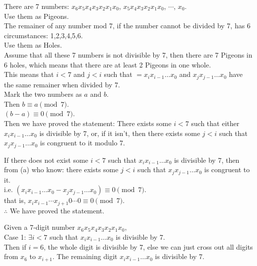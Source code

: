\documentclass[12pt]{exam}
\begin{document}
\begin{solution} 
    \begin{qparts}
        \item
        There are 7 numbers: $x_6 x_5 x_4 x_3 x_2 x_1 x_0$, $x_5 x_4 x_3 x_2 x_1 x_0$, $\cdots$, $x_0$.\\
        Use them as Pigeons.\\
        The remainer of any number mod 7, if the number cannot be divided by 7, has 6 circumstances: 1,2,3,4,5,6.\\
        Use them as Holes.\\
        Assume that all these 7 numbers is not divisible by 7, then there are 7 Pigeons in 6 holes, which means that there are at least 2 Pigeons in one whole.\\
        This means that $i < 7$ and $j < i$ such that $ = x_i x_{i-1} \dots x_0$ and $x_j x_{j-1} \dots x_0$ have the same remainer when divided by 7.\\
        Mark the two numbers as $a $ and $b$.\\
        Then $b \equiv a \pmod{7}$.\\
        $(b-a) \equiv 0 \pmod{7}$.\\
        Then we have proved the statement: There exists some $i < 7$ such that either $x_i x_{i-1} \dots x_0$ is divisible by 7,
        or, if it isn't, then there exists some $j < i$ such that $x_j x_{j-1} \dots x_0$ is congruent to it
        modulo 7.
        \item
        If there does not exist some $i < 7$ such that $x_i x_{i-1} \dots x_0$ is divisible by 7, then from (a) who know: there exists some $j < i$ such that $x_j x_{j-1} \dots x_0$ is congruent to it.\\
        i.e. $(x_i x_{i-1} \dots x_0 - x_j x_{j-1} \dots x_0) \equiv 0 \pmod{7}$.\\
        that is, $x_i x_{i-1} \cdots x_{j+1} 0 \cdots 0 \equiv 0 \pmod{7}$.\\
        $\therefore$ We have proved the statement. 
        \item 
        Given a 7-digit number $x_6 x_5 x_4 x_3 x_2 x_1 x_0$,\\
        Case 1: $\exists i < 7$ such that $x_i x_{i-1} \dots x_0$ is divisible by 7.\\
        Then if $i = 6$, the whole digit is divisible by 7, else we can just cross out all digits from $x_6$ to $x_{i+1}$. The remaining 
        digit $x_i x_{i-1} \dots x_0$ is divisible by 7.\\\\

\end{qparts}
\end{solution}
\end{document}

